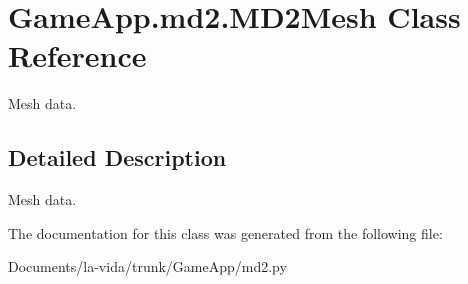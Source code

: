 \hypertarget{classGameApp_1_1md2_1_1MD2Mesh}{
\section{GameApp.md2.MD2Mesh Class Reference}
\label{classGameApp_1_1md2_1_1MD2Mesh}
}
Mesh data.  




\subsection{Detailed Description}
Mesh data. 

The documentation for this class was generated from the following file:\begin{CompactItemize}
\item 
Documents/la-vida/trunk/GameApp/md2.py\end{CompactItemize}
